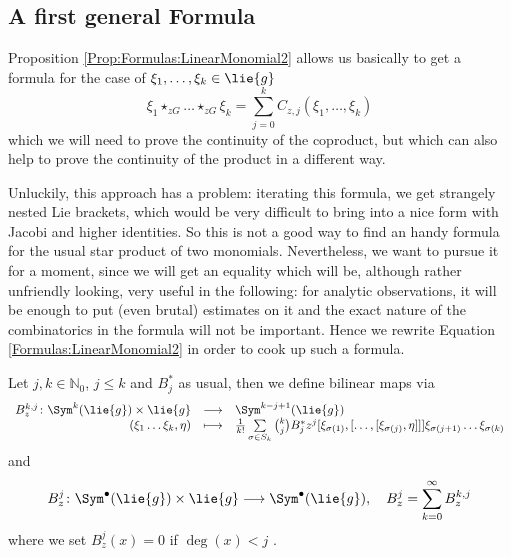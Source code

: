 %
\subsection{A first general Formula}

Proposition \ref{Prop:Formulas:LinearMonomial2} allows us basically 
to get a formula for the case of $\xi_1, \ldots, \xi_k \in \lie{g}$
\begin{equation*}
	\xi_1 \star_{zG} \ldots \star_{zG} \xi_k
	=
	\sum\limits_{j=0}^k
	C_{z,j} \left(
		\xi_1, \ldots, \xi_k
	\right)
\end{equation*}
which we will need to prove the continuity of the coproduct, but which 
can also help to prove the continuity of the product in a different way.

Unluckily, this approach has a problem: iterating this formula, we get 
strangely nested Lie brackets, which would be very difficult to bring 
into a nice form with Jacobi and higher identities. So this is not a 
good way to find an handy formula for the usual star product of two 
monomials. Nevertheless, we want to pursue it for a moment, since we 
will get an equality which will be, although rather unfriendly looking, 
very useful in the following: for analytic observations, it will be 
enough to put (even brutal) estimates on it and the exact nature of the 
combinatorics in the formula will not be important. Hence we rewrite 
Equation \eqref{Formulas:LinearMonomial2} in order to cook up such a 
formula.
\begin{definition}
	\label{Def:Formulas:BMaps}
	Let $j, k \in \mathbb{N}_0$, $j \leq k$ and $B_j^*$ as usual, then 
	we define bilinear maps via
	\begin{equation*}
		\begin{array}{rcl}
			B_z^{k, j} 
			\colon
			\Sym^k(\lie{g}) \times \lie{g}
			&
			\longrightarrow
			&
			\Sym^{k - j + 1}(\lie{g})
			\\
			(\xi_1 \ldots \xi_k, \eta)
			&
			\longmapsto
			&
			\frac{1}{k!}
			\sum\limits_{\sigma \in S_k}
			\binom{k}{j} B_j^* z^j
			[\xi_{\sigma(1)}, [ \ldots, [\xi_{\sigma(j)}, \eta]]] 
			\xi_{\sigma(j + 1)} \ldots \xi_{\sigma(k)}		
		\end{array}
	\end{equation*}
	and
	\begin{equation*}
		B_z^j
		\colon
		\Sym^{\bullet}(\lie{g}) \times \lie{g}
		\longrightarrow
		\Sym^{\bullet}(\lie{g})
		, \quad
		B_z^j 
		= 
		\sum\limits_{k=0}^{\infty}
		B_z^{k, j}
	\end{equation*}
	where we set $B_z^j(x) = 0$ if $\deg(x) < j$ .
\end{definition}
